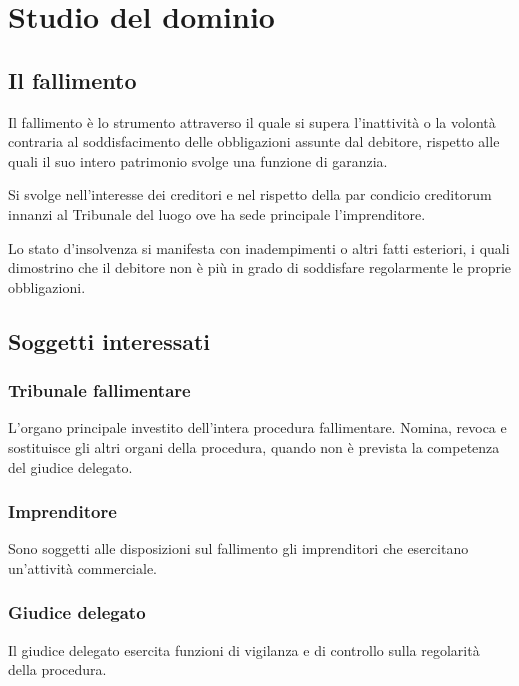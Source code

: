 
\section{Studio del dominio}
\nocite{AmmissionePassivo:Online}
\nocite{ChirografariCuozzo:Online}
\nocite{Curatore:Online}
\nocite{IstanzaFallimentare:Online}
\nocite{ModelliTemplate:Online}
\nocite{wiki:chirografario}
\nocite{wiki:fallimento}

\subsection{Il fallimento}
Il fallimento è lo strumento attraverso il quale si supera l'inattività o la volontà contraria al soddisfacimento delle obbligazioni assunte dal debitore, rispetto alle quali il suo intero patrimonio svolge una funzione di garanzia.

Si svolge nell'interesse dei creditori e nel rispetto della par condicio creditorum innanzi al Tribunale del luogo ove ha sede principale l'imprenditore.

Lo stato d'insolvenza si manifesta con inadempimenti o altri fatti esteriori, i quali dimostrino che il debitore non è più in grado di soddisfare regolarmente le proprie obbligazioni.

\subsection{Soggetti interessati}

\subsubsection{Tribunale fallimentare}
L'organo principale investito dell'intera procedura fallimentare. Nomina, revoca e sostituisce gli altri organi della procedura, quando non è prevista la competenza del giudice delegato.

\subsubsection{Imprenditore}
Sono soggetti alle disposizioni sul fallimento gli imprenditori che esercitano un'attività commerciale.

\subsubsection{Giudice delegato}
Il giudice delegato esercita funzioni di vigilanza e di controllo sulla regolarità della procedura.

